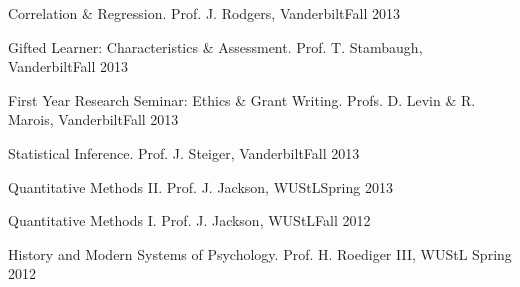 \begin{etaremune}
\item Correlation \& Regression. Prof. J. Rodgers, Vanderbilt\hfill{Fall 2013}
\item Gifted Learner: Characteristics \& Assessment. Prof. T. Stambaugh, Vanderbilt\hfill{Fall 2013}
\item First Year Research Seminar: Ethics \& Grant Writing. Profs. D. Levin \& R. Marois, Vanderbilt\hfill{Fall 2013}
\item Statistical Inference. Prof. J. Steiger, Vanderbilt\hfill{Fall 2013}
\item Quantitative Methods \textrm{II}. Prof. J. Jackson, WUStL\hfill{Spring 2013}
\item Quantitative Methods \textrm{I}. Prof. J. Jackson, WUStL\hfill{Fall 2012}
\item History and Modern Systems of Psychology. Prof. H. Roediger \textrm{III}, WUStL \hfill{Spring 2012}\end{etaremune}